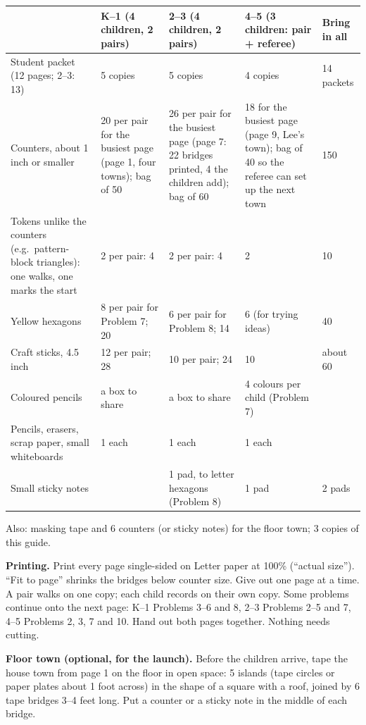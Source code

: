 \documentclass[10pt]{article}
\begin{document}
\begin{tabularx}{\linewidth}{@{}L{3.6cm}YYYL{2.3cm}@{}}
\hline
 & \textbf{K--1} (4 children, 2 pairs) & \textbf{2--3} (4 children, 2 pairs) & \textbf{4--5} (3 children: pair + referee) & \textbf{Bring in all} \\ \hline
Student packet (12 pages; 2--3: 13) & 5 copies & 5 copies & 4 copies & 14 packets \\
Counters, about 1 inch or smaller & 20 per pair for the busiest page (page 1, four towns); bag of 50 & 26 per pair for the busiest page (page 7: 22 bridges printed, 4 the children add); bag of 60 & 18 for the busiest page (page 9, Lee's town); bag of 40 so the referee can set up the next town & 150 \\
Tokens unlike the counters (e.g.\ pattern-block triangles): one walks, one marks the start & 2 per pair: 4 & 2 per pair: 4 & 2 & 10 \\
Yellow hexagons & 8 per pair for Problem 7; 20 & 6 per pair for Problem 8; 14 & 6 (for trying ideas) & 40 \\
Craft sticks, 4.5 inch & 12 per pair; 28 & 10 per pair; 24 & 10 & about 60 \\
Coloured pencils & a box to share & a box to share & 4 colours per child (Problem 7) & \\
Pencils, erasers, scrap paper, small whiteboards & 1 each & 1 each & 1 each & \\
Small sticky notes & & 1 pad, to letter hexagons (Problem 8) & 1 pad & 2 pads \\ \hline
\end{tabularx}

Also: masking tape and 6 counters (or sticky notes) for the floor town; 3 copies of this guide.

\textbf{Printing.} Print every page single-sided on Letter paper at 100\% (``actual size''). ``Fit to page'' shrinks the bridges below counter size. Give out one page at a time. A pair walks on one copy; each child records on their own copy. Some problems continue onto the next page: K--1 Problems 3--6 and 8, 2--3 Problems 2--5 and 7, 4--5 Problems 2, 3, 7 and 10. Hand out both pages together. Nothing needs cutting.

\textbf{Floor town (optional, for the launch).} Before the children arrive, tape the house town from page 1 on the floor in open space: 5 islands (tape circles or paper plates about 1 foot across) in the shape of a square with a roof, joined by 6 tape bridges 3--4 feet long. Put a counter or a sticky note in the middle of each bridge.
\end{document}
